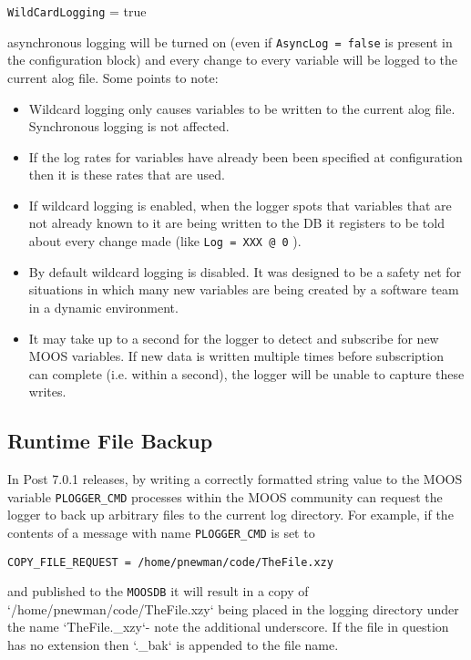\documentclass[a4paper,10pt]{article}
\newcommand{\Code}[1]{\texttt{#1} }
\newcommand{\code}[1]{\Code{#1} }
\newcommand{\DB}   {\code{{MOOSDB}}}
\begin{document}
\begin{center}
\code{WildCardLogging} =  true
\end{center}

asynchronous logging will be turned on (even if \code{AsyncLog = false} is present in the configuration block) and every change to every variable will be logged to the current alog file. Some points to note:

\begin{itemize}
\item Wildcard logging only causes variables to be written to the current alog file. Synchronous logging is not affected.
\item If the log rates for variables have already been been specified at configuration then it is these rates that are used.
\item If wildcard logging is enabled, when the logger spots that variables that are not already known to it are being written to the DB it registers to be told about every change made (like \code{Log = XXX @ 0}).
\item By default wildcard logging is disabled. It was designed to be a safety net for situations in which many new variables are being created by a software team in a dynamic environment.
\item It may take up to a second for the logger to detect and subscribe for new MOOS variables. If new data is written multiple times before subscription can complete (i.e. within a second), the logger will be unable to capture these writes.
\end{itemize}



\subsection{Runtime File Backup}
In Post 7.0.1 releases, by writing a correctly formatted string value to the MOOS variable \code{PLOGGER\_CMD} processes within the MOOS community can request the logger to back up arbitrary files to the current log directory. For example, if the contents of a message with name \code{PLOGGER\_CMD} is set to
\begin{center}
\code{COPY\_FILE\_REQUEST = /home/pnewman/code/TheFile.xzy}
\end{center}
 and published to the \DB  it will result in a copy of `/home/pnewman/code/TheFile.xzy` being placed in the logging directory under the name `TheFile.\_xzy`- note the additional underscore. If the file in question has no extension then `.\_bak` is appended to the file name.
\end{document}
